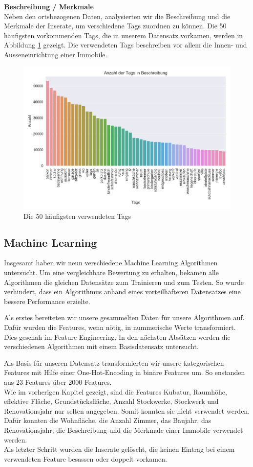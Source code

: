 \textbf{Beschreibung / Merkmale}\\
Neben den ortsbezogenen Daten, analysierten wir die Beschreibung und die Merkmale der Inserate, um verschiedene Tags zuordnen zu können. Die 50 häufigsten vorkommenden Tags, die in unserem Datensatz vorkamen, werden in Abbildung \ref{fig:tags} gezeigt. Die verwendeten Tags beschreiben vor allem die Innen- und Ausseneinrichtung einer Immobile.
%
\begin{figure}[ht]
\centering
\includegraphics[width=\textwidth]{images/tags.png}
\caption[Die 50 häufigsten verwendeten Tags]{Die 50 häufigsten verwendeten Tags}%
\label{fig:tags}
\end{figure}

\subsection{Machine Learning}
Insgesamt haben wir neun verschiedene Machine Learning Algorithmen untersucht. Um eine vergleichbare Bewertung zu erhalten, bekamen alle Algorithmen die gleichen Datensätze zum Trainieren und zum Testen. So wurde verhindert, dass ein Algorithmus anhand eines vorteilhafteren Datensatzes eine bessere Performance erzielte.

Als erstes bereiteten wir unsere gesammelten Daten für unsere Algorithmen auf. Dafür wurden die Features, wenn nötig, in nummerische Werte transformiert. Dies geschah im Feature Engineering. In den nächsten Absätzen werden die verschiedenen Algorithmen mit einem Basisdatensatz untersucht.

Als Basis für unseren Datensatz transformierten wir unsere kategorischen Features mit Hilfe einer One-Hot-Encoding in binäre Features um. So enstanden aus 23 Features über 2000 Features.\\
Wie im vorherigen Kapitel gezeigt, sind die Features Kubatur, Raumhöhe, effektive Fläche, Grundstücksfläche, Anzahl Stockwerke, Stockwerk und Renovationsjahr nur selten angegeben. Somit konnten sie nicht verwendet werden. Dafür konnten die Wohnfläche, die Anzahl Zimmer, das Baujahr, das Renovationsjahr, die Beschreibung und die Merkmale einer Immobile verwendet werden.\\
Als letzter Schritt wurden die Inserate gelöscht, die keinen Eintrag bei einem verwendeten Feature besassen oder doppelt vorkamen.

